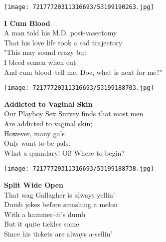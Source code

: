 \documentclass[10pt,letterpaper]{article}
\begin{document}
\begin{center}
\texttt{[image: 72177720311316693/53199190263.jpg]}
\end{center}

\begin{center}
\textbf{I Cum Blood}\\
\vskip 0.2in
A man told his M.D. post-vasectomy\\
That his love life took a sad trajectory\\
"This may sound crazy but\\
I bleed semen when cut\\
And cum blood--tell me, Doc, what is next for me?"\\
\end{center}
\pagebreak

\begin{center}
\texttt{[image: 72177720311316693/53199188703.jpg]}
\end{center}

\begin{center}
\textbf{Addicted to Vaginal Skin}\\
\vskip 0.2in
Our Playboy Sex Survey finds that most men\\
Are addicted to vaginal skin;\\
However, many gals\\
Only want to be pals.\\
What a quandary!  Oi!  Where to begin?\\
\end{center}
\pagebreak

\begin{center}
\texttt{[image: 72177720311316693/53199188738.jpg]}
\end{center}

\begin{center}
\textbf{Split Wide Open}\\
\vskip 0.2in
That wag Gallagher is always yellin'\\
Dumb jokes before smashing a melon\\
With a hammer--it's dumb\\
But it quite tickles some\\
Since his tickets are always a-sellin'\\
\end{center}
\pagebreak
\end{document}
